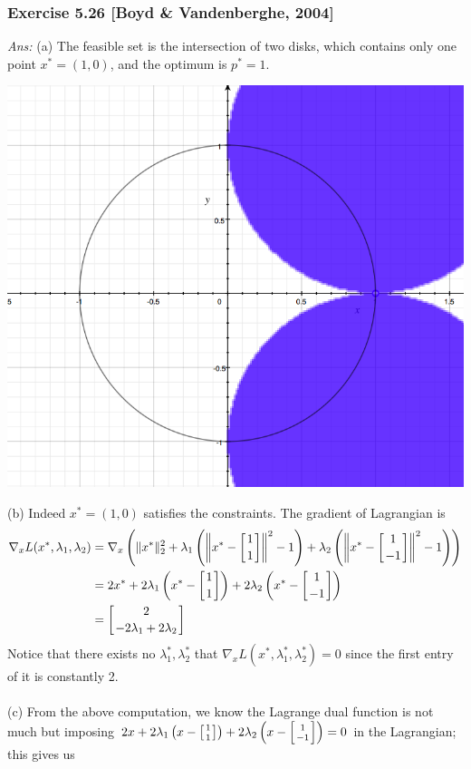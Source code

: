 \documentclass[12pt,a4paper]{article}
\renewcommand{\l}{\left}\renewcommand{\r}{\right}
\begin{document}
\subsubsection*{Exercise 5.26 [Boyd \& Vandenberghe, 2004]}
{\it Ans:} 
(a) The feasible set is the intersection of two disks, which contains only one point $x^\ast = (1,0)$, and the optimum is $p^\ast = 1$. 
\begin{center}
\includegraphics[scale=0.2]{hw7P526}
\end{center}
(b) Indeed $x^\ast = (1,0)$ satisfies the constraints. The gradient of Lagrangian is 
\begin{align*}
\nabla_x L(x^\ast, \lambda_1,\lambda_2) &= \nabla_x\l(\|x^\ast\|_2^2 + \lambda_1\l(\l\|x^\ast-\l[{1\atop 1}\r]\r\|^2 - 1\r) + \lambda_2\l(\l\|x^\ast-\l[{1\atop -1}\r]\r\|^2 - 1\r)\r) \\
&= 2x^\ast + 2\lambda_1\l(x^\ast-\l[{1\atop 1}\r]\r) + 2\lambda_2\l(x^\ast - \l[{1\atop -1}\r]\r) \\
&= \l[{2  \atop -2\lambda_1 + 2\lambda_2 }\r]
\end{align*}
Notice that there exists no $\lambda_1^\ast, \lambda_2^\ast$ that $\nabla_x L(x^\ast, \lambda_1^\ast,\lambda_2^\ast) = 0$ since the first entry of it is constantly 2. \\
\\
(c) From the above computation, we know the Lagrange dual function is not much but imposing $2x+ 2\lambda_1\l(x-\l[{1\atop 1}\r]\r) + 2\lambda_2\l(x - \l[{1\atop -1}\r]\r) = 0$ in the Lagrangian; this gives us
\end{document}
